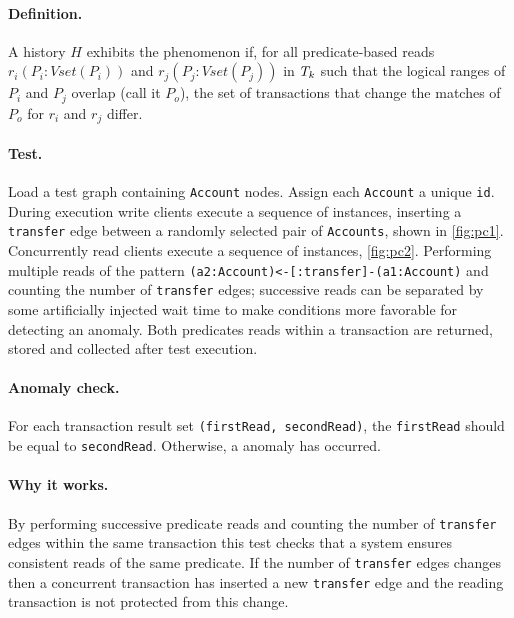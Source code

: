 \paragraph{Definition.}
A history $H$ exhibits the phenomenon  if, for all predicate-based reads $r_i(P_i : \textit{Vset}(P_i))$ and $r_j(P_j : \textit{Vset}(P_j))$ in $T_k$ such that the logical ranges of $P_i$ and $P_j$ overlap (call it $P_o$), the set of transactions that change the matches of $P_o$ for $r_i$ and $r_j$ differ.

\paragraph{Test.}
Load a test graph containing \texttt{Account} nodes. Assign each \texttt{Account} 
a unique \texttt{id}. During execution write clients execute a sequence of 
 instances, inserting a \texttt{transfer} edge between a 
randomly selected pair of \texttt{Accounts}, shown in \autoref{fig:pc1}. 
Concurrently read clients execute a sequence of  
instances, \autoref{fig:pc2}. Performing multiple reads of the pattern 
\texttt{(a2:Account)<-[:transfer]-(a1:Account)} and counting the number of 
\texttt{transfer} edges; successive reads can be separated by some artificially 
injected wait time to make conditions more favorable for detecting an anomaly.
Both predicates reads within a  transaction are returned, 
stored and collected after test execution.

\paragraph{Anomaly check.}
For each  transaction result set 
\texttt{(firstRead, secondRead)}, the \texttt{firstRead} should be equal to 
\texttt{secondRead}. Otherwise, a  anomaly has occurred.

\paragraph{Why it works.}
By performing successive predicate reads and counting the number of 
\texttt{transfer} edges within the same transaction this test checks that a 
system ensures consistent reads of the same predicate. If the number of 
\texttt{transfer} edges changes then a concurrent transaction has inserted a new
\texttt{transfer} edge and the reading transaction is not protected from this 
change.

